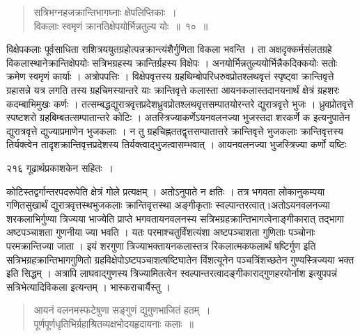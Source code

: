 \documentclass[11pt, openany]{book}
\begin{document}

\begin{quote}
{\ssi सत्रिभग्नहजक्रान्तिभागघ्नाः क्षेपलिप्तिकाः~।\\
 विकलाः स्वमृणं क्रानतिक्षेपयोर्भिन्नतुल्य योः~॥~१०~॥ }
 \end{quote}
 
 
 विक्षेपकलाः पूर्वसाधिता राशित्रययुतग्रहोत्पन्नक्रान्त्यंशैर्गुणिता विकला भवन्ति । ता अक्षदृक्कर्मसंलतग्रहे विकलास्थानेक्रान्तिक्षेपयोः सत्रिभग्रहस्य क्रान्तिर्ग्रहस्य विक्षेपः । अनयोर्भिन्नतुल्ययोर्भिन्नैकदिक्कयोः सतोः क्रमेण स्वमृणं कार्याः । अत्रोपपत्तिः । विक्षेपवृत्तस्य ग्रहथिम्बोपरिधरुवप्रोतश्लथवृत्तं स्पृष्ट्वा क्रान्तिवृत्ते ग्रहासन्ने यत्र लगति तस्य ग्रहचिमस्यान्तरे याः क्रान्तिवृत्ते कलास्ता आयनकलास्तदानयनार्थं क्षेत्रं ग्रहशरः कदम्बाभिमुखः कर्णः । तत्सम्बद्धद्युरात्रवृत्तप्रदेशध्रुवप्रोतश्लथवृत्तसम्पातयोरन्तरे द्युरात्रवृत्ते भुजः । ध्रुवप्रोतवृत्ते स्पष्टशरो ग्रहबिम्बतत्सम्पातान्तरे कोटिः । अतस्त्रिज्याकर्णेऽयनवलनज्या भुजस्तदा शरकर्णे क इत्यनुपातेन द्युरात्रवृत्ते द्युज्याप्रमाणेन भुजकलाः । न तु ग्रहचिह्नततद्वृत्तसम्पातात्तरे क्रान्तिवृत्ते भुजकलाः क्रान्तिवृत्तस्य तिर्यक्त्वेन तादृशक्रान्तिवृत्तप्रदेशस्य तिर्यक्त्वाद्भुजत्वासम्भवात् । आयनवलनज्या भुजस्त्रिज्या कर्णो यष्टिः


\newpage

\noindent २१६ \hspace{4cm} गूढार्थप्रकाशकेन सहितः~।
\vspace{1cm}


\noindent कोटिस्तद्वर्गान्तरपदरूपेति क्षेत्रं गोले प्रत्यक्षम् । अतोऽनुपाते न क्षतिः । तत्र भगवता लोकानुकम्पया गणितसुखार्थं द्युरात्रवृत्तस्थभुजकलाः क्रान्तिवृत्तस्था अङ्गीकृताः स्वल्पान्तरत्वात्।अतोऽयनवलनज्या शरकलाभिर्गुण्या त्रिज्यया भाज्येति प्राप्ते भगवतायनवलनस्य सत्रिभग्रहक्रान्तिभागत्वेनाङ्गीकारात् तद्भागा अष्टपञ्चाशता गुणनीया ज्या भवति । यतः परमाश्चतुर्विंशत्यंशा अष्टपञ्चाशता गुणिताः पञ्चोनाः परमक्रान्तिज्या जाता । इयं शरगुणा त्रिज्याभक्तायनकलास्तत्र रिकलात्मकफलार्थं षष्टिर्गुण इति सत्रिभग्रहक्रान्तिभागगुणितो ग्रहविक्षेपोऽष्टपञ्चाशत्षष्टिघातेन विंशत्यूनेन पञ्चत्रिंशच्छतेन गुण्यस्त्रिज्यया भक्त इति सिद्धम् । अत्रापि लाघवाद्गुणस्य त्रिज्यामितत्वेन स्वल्पान्तरत्वादङ्गीकाराद्गुणहरयोर्नाश इत्युपपन्नं सत्रिभेत्यादिविकला इत्यन्तम् । भास्कराचार्यैस्तु । 


 \begin{quote}
 {\qt आयनं वलनमस्फटेषुणा सङ्गुणं द्युगुणभाजितं हतम्~।\\
 पूर्णपूर्णधृतिभिर्ग्रहाश्रितव्यक्षभोदयहृदायनाः कलाः~॥}
 \end{quote}
\end{document}
